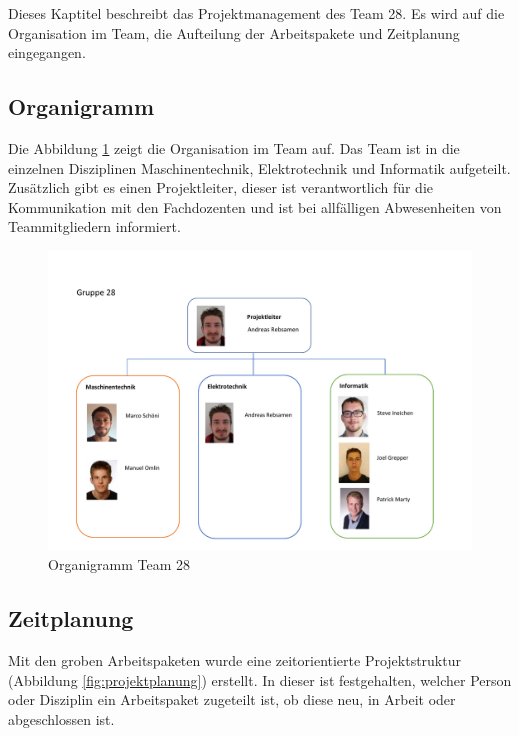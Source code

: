\documentclass[../../main.tex]{subfiles}
\begin{document}
Dieses Kaptitel beschreibt das Projektmanagement des Team 28. Es wird auf die Organisation im Team, die Aufteilung der Arbeitspakete und Zeitplanung eingegangen.

\subsection{Organigramm}
Die Abbildung \ref{fig:organigramm} zeigt die Organisation im Team auf. Das Team ist in die einzelnen Disziplinen Maschinentechnik, Elektrotechnik und Informatik aufgeteilt. Zusätzlich gibt es einen Projektleiter, dieser ist verantwortlich für die Kommunikation mit den Fachdozenten und ist bei allfälligen Abwesenheiten von Teammitgliedern informiert.


\begin{figure}[H] \centering
    \includegraphics[page=1,width=.9\textwidth, trim=1cm .5cm 1cm 3.2cm, clip]{Organigramm.pdf}
    \caption{Organigramm Team 28}
    \label{fig:organigramm}
\end{figure}
\pagebreak
\subsection{Zeitplanung}
Mit den groben Arbeitspaketen wurde eine zeitorientierte Projektstruktur (Abbildung \ref{fig:projektplanung}) erstellt. In dieser ist festgehalten, welcher Person oder Disziplin ein Arbeitspaket zugeteilt ist, ob diese neu, in Arbeit oder abgeschlossen ist. \\
\end{document}

